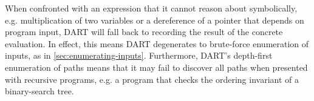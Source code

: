 When confronted with an expression that it cannot reason about
symbolically, e.g. multiplication of two variables or a dereference of a
pointer that depends on program input, DART will fall back to recording
the result of the concrete evaluation.
%
In effect, this means DART degenerates to brute-force enumeration of
inputs, as in \autoref{sec:enumerating-inputs}.
%
Furthermore, DART's depth-first enumeration of paths means that it may
fail to discover all paths when presented with recursive programs,
e.g. a program that checks the ordering invariant of a binary-search
tree.
%

